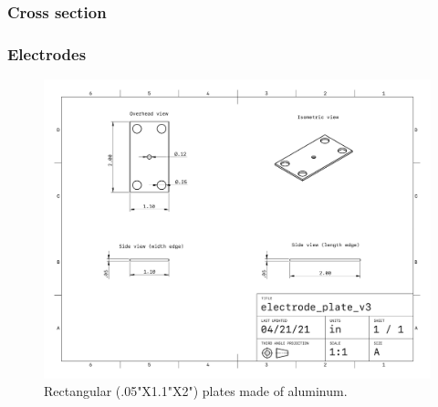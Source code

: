 \subsubsection{Cross section}

\subsubsection{Electrodes}

\begin{figure}[H]
  \centering
  \includegraphics[width=.776\textwidth]{figs/ALGAAS/assemblies/assembly2/assembly2_electrode.pdf}
  \caption{Rectangular (.05"X1.1"X2") plates made of aluminum.}
\end{figure}

\newpage
